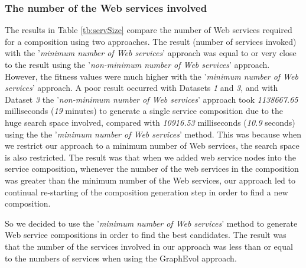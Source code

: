 
\subsubsection{The number of the Web services involved} 

The results in Table \ref{tb:servSize} compare the number of Web services required for a composition using two approaches. The result (number of services invoked) with the {'}\emph{minimum number of Web services}{'} approach was equal to or very close to the result using the {'}\emph{non-minimum number of Web services}{'} approach. However, the fitness values were much higher with the {'}\emph{minimum number of Web services}{'} approach. A poor result occurred with Datasets \emph{1} and \emph{3}, and with Dataset \emph{3} the {'}\emph{non-minimum number of Web services}{'} approach took \emph{1138667.65} milliseconds (\emph{19} minutes) to generate a single service composition due to the huge search space involved, compared with \emph{10916.53} milliseconds (\emph{10.9} seconds) using the the {'}\emph{minimum number of Web services}{'} method. This was because when we restrict our approach to a minimum number of Web services, the search space is also restricted. The result was that when we added web service nodes into the service composition, whenever the number of the web services in the composition was greater than the minimum number of the Web services, our approach led to continual re-starting of the composition generation step in order to find a new composition.\par

So we decided to use the {'}\emph{minimum number of Web services}{'} method to generate Web service compositions in order to find the best candidates. The result was that the number of the services involved in our approach was less than or equal to the numbers of services when using the GraphEvol approach.\par

